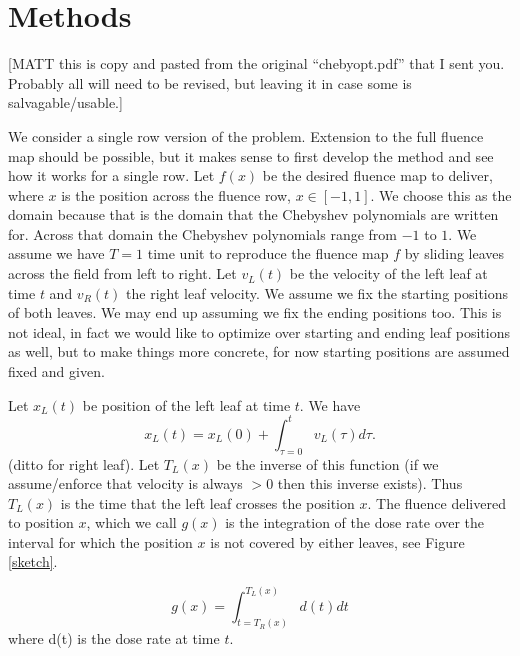 \documentclass[12pt]{article}
\begin{document}
\section{Methods}

[MATT this is copy and pasted from the original ``chebyopt.pdf'' that I sent you. Probably all will need to be revised, but leaving it in case some is salvagable/usable.]

We consider a single row version of the problem. Extension to the full fluence map should be possible, but it makes sense
to first develop the method and see how it works for a single row. Let $f(x)$ be the desired fluence map to deliver, where
$x$ is the position across the fluence row, $x \in [-1,1]$. We choose this as the domain because that is the
domain that the Chebyshev polynomials are written for. Across that domain the Chebyshev polynomials range from $-1$ to $1$.
We assume we have $T=1$ time unit to reproduce the fluence map $f$ by sliding leaves across the field from left to right.
Let $v_L(t)$ be the velocity of the left leaf at time $t$ and $v_R(t)$ the right leaf velocity. We assume we fix the starting positions
of both leaves. We may end up assuming we fix the ending positions too. This is not ideal, in fact we would like to optimize over
starting and ending leaf positions as well, but to make things more concrete, for now starting positions are assumed fixed and given.

Let $x_L(t)$ be position of the left leaf at time $t$. We have
\begin{equation}
  x_L(t) = x_L(0) + \int_{\tau=0}^t v_L(\tau) d\tau. 
\end{equation}
\noindent (ditto for right leaf). Let $T_L(x)$ be the inverse of this function
(if we assume/enforce that velocity is always $>0$ then this inverse exists). Thus
$T_L(x)$ is the time that the left leaf crosses the position $x$. The fluence delivered to position
$x$, which we call $g(x)$ is the integration of the dose rate over the interval for which the position $x$ is not covered by either leaves, see Figure \ref{sketch}.


\begin{equation}
  g(x) = \int_{t = T_R(x)}^{T_L(x)} d(t) dt
\end{equation}
\noindent where d(t) is the dose rate at time $t$.
\end{document}
